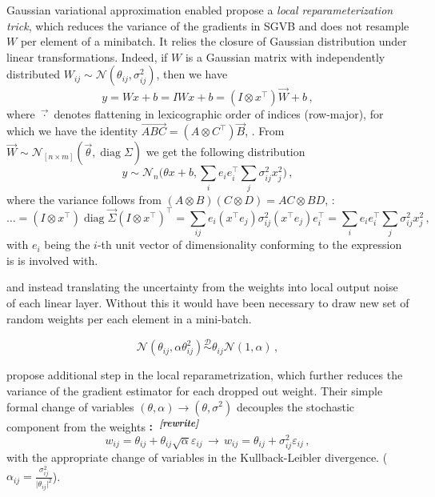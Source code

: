 \documentclass[a4paper,10pt]{article}
\newcommand{\attn}[2]{\textbf{\color{red} #2~\textsuperscript{\textit{[#1]}}}}
\newcommand{\rewrite}[1]{\attn{rewrite}{#1}}
\renewcommand{\vec}{\overrightarrow}
\begin{document}
Gaussian variational approximation enabled \cite{kingma_variational_2015} propose a
\textit{local reparameterization trick}, which reduces the variance of the gradients
in SGVB and does not resample $W$ per element of a minibatch. It relies the closure
of Gaussian distribution under linear transformations. Indeed, if $W$ is a Gaussian
matrix with independently distributed $
  W_{ij} \sim \mathcal{N}(\theta_{ij}, \sigma^2_{ij})
$, then we have
$$
y 
  = W x + b
  = I W x + b
  = (I \otimes x^\top) \vec{W} + b
  \,, $$
where $\vec{\cdot}$ denotes flattening in lexicographic order of indices (row-major),
for which we have the identity $\vec{A B C} = (A \otimes C^\top) \vec{B}$, \cite{cookbook2012}.
From $\vec{W} \sim \mathcal{N}_{[n\times m]}(\vec{\theta}, \mathop{diag}\Sigma)$ we get
the following distribution
$$
y \sim \mathcal{N}_{n}
  \bigl(
    \theta x + b,
    \sum_{i} e_i e_i^\top \sum_j \sigma^2_{ij} x_j^2
  \bigr)
  \,, $$
where the variance follows from $(A\otimes B) (C\otimes D) = AC\otimes BD$, \cite{cookbook2012}:
$$
\ldots
  = (I \otimes x^\top) \mathop{diag}{\vec{\Sigma}} (I \otimes x^\top)^\top
  = \sum_{ij} e_i (x^\top e_j) \sigma^2_{ij} (x^\top e_j) e_i^\top
  = \sum_{i} e_i e_i^\top \sum_j \sigma^2_{ij} x_j^2
  \,, $$
with $e_i$ being the $i$-th unit vector of dimensionality conforming to the expression
is is involved with.


and instead
translating the uncertainty from the weights into local output noise of each linear layer.
Without this it would have been necessary to draw new set of random weights per each element
in a mini-batch.

$$
  \mathcal{N}(\theta_{ij}, \alpha \theta^2_{ij})
  \overset{\mathcal{D}}{\sim}
  \theta_{ij} \mathcal{N}(1, \alpha)
  \,, $$

\cite{molchanov_variational_2017} propose additional step in the local reparametrization,
which further reduces the variance of the gradient estimator for each dropped out
weight. Their simple formal change of variables $(\theta, \alpha) \to (\theta, \sigma^2)$
decouples the stochastic component from the weights \rewrite:
$$
  w_{ij} = \theta_{ij} + \theta_{ij} \sqrt{\alpha} \varepsilon_{ij}
  \,\to\,
  w_{ij} = \theta_{ij} + \sigma^2_{ij} \varepsilon_{ij}
  \,, $$
with the appropriate change of variables in the Kullback-Leibler divergence.
($\alpha_{ij} = \tfrac{\sigma_{ij}^2}{\lvert \theta_{ij}\rvert^2}$).
\end{document}
